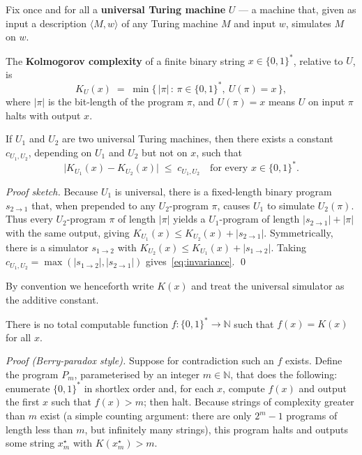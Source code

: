 Fix once and for all a \textbf{universal Turing machine} $U$ --- a
machine that, given as input a description $\langle M, w\rangle$ of any
Turing machine $M$ and input $w$, simulates $M$ on $w$.

\begin{definition}
\label{def:kolmogorov}
The \textbf{Kolmogorov complexity} of a finite binary string
$x \in \{0,1\}^*$, relative to $U$, is
\begin{equation}
  K_U(x)
  \;=\; \min\bigl\{\, |\pi| \,:\, \pi \in \{0,1\}^*,\ U(\pi) = x \,\bigr\}, \label{eq:kolmogorov}
\end{equation}
where $|\pi|$ is the bit-length of the program $\pi$, and $U(\pi) = x$
means $U$ on input $\pi$ halts with output $x$.
\end{definition}

\begin{theorem}
\label{thm:invariance}
If $U_1$ and $U_2$ are two universal Turing machines, then there exists
a constant $c_{U_1,U_2}$, depending on $U_1$ and $U_2$ but not on $x$,
such that
\begin{equation}
  \bigl| K_{U_1}(x) - K_{U_2}(x) \bigr| \;\le\; c_{U_1,U_2}
  \quad \text{for every } x \in \{0,1\}^*. \label{eq:invariance}
\end{equation}
\end{theorem}

\emph{Proof sketch.} Because $U_1$ is universal, there is a fixed-length
binary program $s_{2\to 1}$ that, when prepended to any $U_2$-program
$\pi$, causes $U_1$ to simulate $U_2(\pi)$. Thus every $U_2$-program
$\pi$ of length $|\pi|$ yields a $U_1$-program of length
$|s_{2\to 1}| + |\pi|$ with the same output, giving
$K_{U_1}(x) \le K_{U_2}(x) + |s_{2\to 1}|$. Symmetrically, there is a
simulator $s_{1\to 2}$ with $K_{U_2}(x) \le K_{U_1}(x) + |s_{1\to 2}|$.
Taking $c_{U_1,U_2} = \max(|s_{1\to 2}|, |s_{2\to 1}|)$
gives~\eqref{eq:invariance}. \qed

By convention we henceforth write $K(x)$ and treat the universal
simulator as the additive constant.

\begin{theorem}[Uncomputability of $K$]
\label{thm:uncomputable}
There is no total computable function $f : \{0,1\}^* \to \mathbb{N}$
such that $f(x) = K(x)$ for all $x$.
\end{theorem}

\emph{Proof (Berry-paradox style).} Suppose for contradiction such an
$f$ exists. Define the program $P_m$, parameterised by an integer
$m \in \mathbb{N}$, that does the following: enumerate
$\{0,1\}^*$ in shortlex order and, for each $x$, compute $f(x)$ and
output the first $x$ such that $f(x) > m$; then halt. Because strings
of complexity greater than $m$ exist (a simple counting argument:
there are only $2^m - 1$ programs of length less than $m$, but
infinitely many strings), this program halts and outputs some string
$x_m^\star$ with $K(x_m^\star) > m$.

